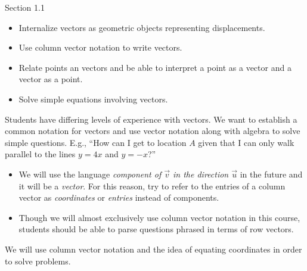 \documentclass{problemset}
\begin{document}
\begin{lesson}

	 Section 1.1

	\begin{itemize}
		\item Internalize vectors as geometric objects representing displacements.

		\item Use column vector notation to write vectors.

		\item Relate points an vectors and be able to interpret a point as
			a vector and a vector as a point.

		\item Solve simple equations involving vectors.
	\end{itemize}

	 Students have differing levels of experience with vectors.
	We want to establish a common notation for vectors and use vector notation
	along with algebra to solve simple questions. E.g., ``How can I get to location
	$A$ given that I can only walk parallel to the lines $y=4x$ and $y=-x$?''


	\begin{annotation}
		\begin{notes}
			\begin{itemize}
			\item
			We will use the language \emph{component of $\vec v$ in
			the direction $\vec u$} in the future and it will be a \emph{vector}.
			For this reason, try to refer to the entries of a column
			vector as \emph{coordinates} or \emph{entries} instead of components.

			\item
			Though we will almost exclusively use
			column vector notation in this course, students should be able to parse
			questions phrased in terms of row vectors.
			\end{itemize}
		\end{notes}
	\end{annotation}We will use column vector notation and the idea of equating
	coordinates in order to solve problems.

\end{lesson}
\end{document}
